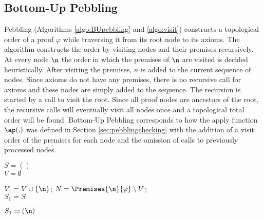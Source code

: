 \subsection{Bottom-Up Pebbling}

 Pebbling (Algorithms \ref{algo:BUpebbling} and \ref{algo:visit}) constructs a topological order of a proof $\varphi$ while traversing it from its root node to its axioms. The algorithm constructs the order by visiting nodes and their premises recursively. At every node $\n$ the order in which the premises of $\n$ are visited is decided heuristically. After visiting the premises, $n$ is added to the current sequence of nodes.
Since axioms do not have any premises, there is no recursive call for axioms and these nodes are simply added to the sequence. The recursion is started by a call to visit the root.
Since all proof nodes are ancestors of the root, the recursive calls will eventually visit all nodes once and a topological total order will be found.
Bottom-Up Pebbling corresponds to how the apply function $\ap(.)$ was defined in Section \ref{sec:pebblingchecking} with the addition of a visit order of the premises for each node and the omission of calls to previously processed nodes.


\begin{algorithm}[h]
  \BlankLine

	$S = ()$\; \\
	$V = \emptyset$\;
	\Return {}\;

  \caption[.]{}
  \label{algo:BUpebbling}
\end{algorithm}

\begin{algorithm}[h]
	
	$V_1 = V \cup \{\n\}$;
	$N = \Premises{\n}{\varphi} \setminus V$;  \\
	$S_1 = S$\;
	
	
	\Return $S_1 ::: (\n)$\;
	
  \caption[.]{}
  \label{algo:visit}
\end{algorithm}

